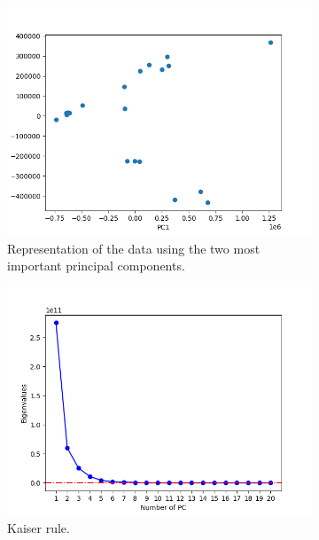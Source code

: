 \documentclass[11pt,a4paper]{article}
\begin{document}
\begin{figure}[H]
  \centering
  \begin{subfigure}[t]{.5\textwidth}
    \centering
    \includegraphics[scale=0.4]{img/pc_genes}
    \caption{Representation of the data using the two most important principal components.}
  \end{subfigure}%
  \begin{subfigure}[t]{.5\textwidth}
    \centering
    \includegraphics[scale=0.4]{img/pc_genes_kaiser}
    \caption{Kaiser rule.}
  \end{subfigure}
  \begin{subfigure}[t]{.5\textwidth}
    \centering

\end{subfigure}
\end{figure}
\end{document}
